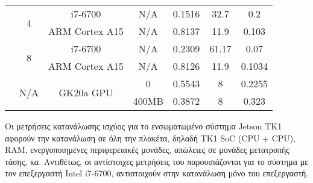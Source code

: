 \begin{table}[H]
\begin{center}
\begin{tabular}[center]{ | c | c | c | c | c | c | c | }
                                  & \multirow{2}{*}{4}    & i7-6700                     & N/A     & 0.1516  & 32.7    & 0.2     \\ \cline{3-7}
                                  &                       & ARM Cortex A15              & N/A     & 0.8137  & 11.9    & 0.103   \\ \cline{2-7}
                                  & \multirow{2}{*}{8}    & i7-6700                     & N/A     & 0.2309  & 61.17   & 0.07    \\ \cline{3-7}
                                  &                       & ARM Cortex A15              & N/A     & 0.8126  & 11.9    & 0.1034  \\ \cline{2-7}
                                  & \multirow{2}{*}{N/A}  & \multirow{2}{*}{GK20a GPU}  & 0       & 0.5543  & 8       & 0.2255  \\ \cline{4-7}
                                  &                       &                             & 400MB   & 0.3872  & 8       & 0.323   \\
      \hline
    \end{tabular}
  \end{center}
\end{table}


Οι μετρήσεις κατανάλωσης ισχύος για το ενσωματωμένο σύστημα Jetson TK1 αφορούν την
κατανάλωση σε όλη την πλακέτα, δηλαδή TK1 SoC (CPU + CPU), RAM, ενεργοποιημένες περιφερειακές μονάδες,
απώλειες σε μονάδες μετατροπής τάσης, κα.
Αντιθέτως, οι αντίστοιχες μετρήσεις του παρουσιάζονται για το σύστημα με τον
επεξεργαστή Intel i7-6700, αντιστοιχούν στην κατανάλωση μόνο του επεξεργαστή.
